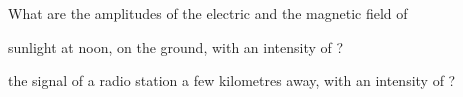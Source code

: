 What are the amplitudes of the electric and the magnetic field of

\begin{abcliste}
\abc sunlight at noon, on the ground, with an intensity of \IsO?

\abc the signal of a radio station a few kilometres away, with an intensity of \IrO?
\end{abcliste}
